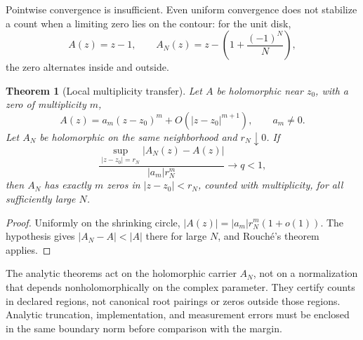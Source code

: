 \documentclass[11pt,a4paper]{article}
\theoremstyle{definition}
\theoremstyle{plain}
\newtheorem{theorem}[definition]{Theorem}
\theoremstyle{remark}
\begin{document}
Pointwise convergence is insufficient.  Even uniform convergence does not
stabilize a count when a limiting zero lies on the contour: for the unit disk,
\[
 A(z)=z-1,\qquad
 A_N(z)=z-\left(1+\frac{(-1)^N}{N}\right),
\]
the zero alternates inside and outside.

\begin{theorem}[Local multiplicity transfer]\label{thm:rootstability}
Let \(A\) be holomorphic near \(z_0\), with a zero of multiplicity \(m\),
\[
 A(z)=a_m(z-z_0)^m+O(|z-z_0|^{m+1}),\qquad a_m\ne0.
\]
Let \(A_N\) be holomorphic on the same neighborhood and \(r_N\downarrow0\).
If
\[
 \frac{\sup_{|z-z_0|=r_N}|A_N(z)-A(z)|}
      {|a_m|r_N^m}
 \longrightarrow q<1,
\]
then \(A_N\) has exactly \(m\) zeros in
\(|z-z_0|<r_N\), counted with multiplicity, for all sufficiently large \(N\).
\end{theorem}
\begin{proof}
Uniformly on the shrinking circle,
\(|A(z)|=|a_m|r_N^m(1+o(1))\).  The hypothesis gives
\(|A_N-A|<|A|\) there for large \(N\), and Rouch\'e's theorem applies.
\end{proof}

The analytic theorems act on the holomorphic carrier \(A_N\), not on a
normalization that depends nonholomorphically on the complex parameter.  They
certify counts in declared regions, not canonical root pairings or zeros
outside those regions.  Analytic truncation, implementation, and measurement
errors must be enclosed in the same boundary norm before comparison with the
margin.
\end{document}
